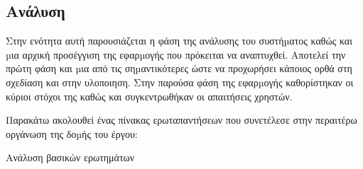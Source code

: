 \documentclass[a4paper,12pt]{article}
\begin{document}
		\subsection{Ανάλυση}

		Στην ενότητα αυτή παρουσιάζεται η φάση της ανάλυσης του συστήµατος καθώς και
		µια αρχική προσέγγιση της εφαρµογής που πρόκειται να αναπτυχθεί. Αποτελεί την
		πρώτη φάση και µια από τις σηµαντικότερες ώστε να προχωρήσει κάποιος ορθά στη
		σχεδίαση και στην υλοποιηση. Στην παρούσα φάση της εφαρµογής καθορίστηκαν οι κύριοι στόχοι της
		καθώς και συγκεντρωθήκαν οι απαιτήσεις χρηστών.
		
		Παρακάτω ακολουθεί ένας
		πίνακας ερωταπαντήσεων που συνετέλεσε στην περαιτέρω οργάνωση
		της δοµής του έργου:

			
		\begin{table}[htb]
			\centering
			\caption{Ανάλυση βασικών ερωτημάτων}
			\vspace*{0.2cm}			
			\label{tab:my-table}
			\resizebox{\textwidth}{!}{%
			{\renewcommand{\arraystretch}{1.5}

}}
\end{table}
\end{document}
